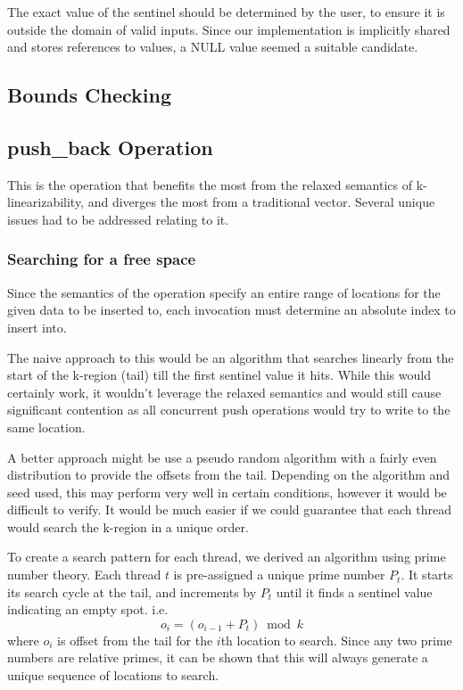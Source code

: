 \documentclass{sigplanconf}
\begin{document}
The exact value of the sentinel should be determined by the user, to ensure it is outside the domain of valid inputs. Since our implementation is implicitly shared and stores references to values, a NULL value seemed a suitable candidate.

\subsection{Bounds Checking}

\subsection{push\_back Operation}

This is the operation that benefits the most from the relaxed semantics of k-linearizability, and diverges the most from a traditional vector. Several unique issues had to be addressed relating to it.

\subsubsection{Searching for a free space}


Since the semantics of the operation specify an entire range of locations
for the given data to be inserted to, each invocation must determine an absolute index to insert into.

The naive approach to this would be an algorithm that searches linearly
from the start of the k-region (tail) till the first sentinel value
it hits. While this would certainly work, it wouldn't leverage the
relaxed semantics and would still cause significant contention as
all concurrent push operations would try to write to the same location.

A better approach might be use a pseudo random algorithm with a fairly
even distribution to provide the offsets from the tail. Depending
on the algorithm and seed used, this may perform very well in certain
conditions, however it would be difficult to verify. It would be much
easier if we could guarantee that each thread would search the k-region
in a unique order.

To create a search pattern for each thread, we derived an algorithm
using prime number theory. Each thread $t$ is pre-assigned a unique
prime number $P_{t}$. It starts its search cycle at the tail, and
increments by $P_{t}$ until it finds a sentinel value indicating
an empty spot. i.e.
$$o_{i}=(o_{i-1}+P_{t})\bmod{k}$$
where $o_{i}$ is offset from the tail for the $i$th location to
search. Since any two prime numbers are relative primes, it can be
shown that this will always generate a unique sequence of locations
to search.
\end{document}
